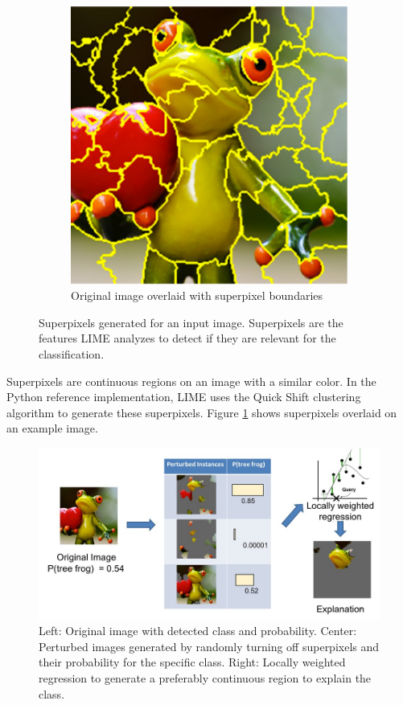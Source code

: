 \begin{figure}[H]
\begin{subfigure}[t]{.35\textwidth}
        \includegraphics[width=\linewidth]{chapters/02_methods/images/frog2.png}
        \caption{Original image overlaid with superpixel boundaries}
    \end{subfigure}
    \caption{Superpixels generated for an input image. Superpixels are the features LIME analyzes to detect if they are relevant for the classification.\cite{limeoreilly}}
    \label{lime_superpixel}
\end{figure}


Superpixels are continuous regions on an image with a similar color. In the Python reference implementation, LIME uses the Quick Shift \cite{vedaldi2008quick} clustering algorithm to generate these superpixels. Figure \ref{lime_superpixel} shows superpixels overlaid on an example image.

\begin{figure}[H]
\centering
\includegraphics[width=14cm]{chapters/02_methods/images/lime2.jpg}
\caption{Left: Original image with detected class and probability. Center: Perturbed images generated by randomly turning off superpixels and their probability for the specific class.
Right: Locally weighted regression to generate a preferably continuous region to explain the class.\cite{limeoreilly}}
\label{lime_perturbed}
\end{figure}

